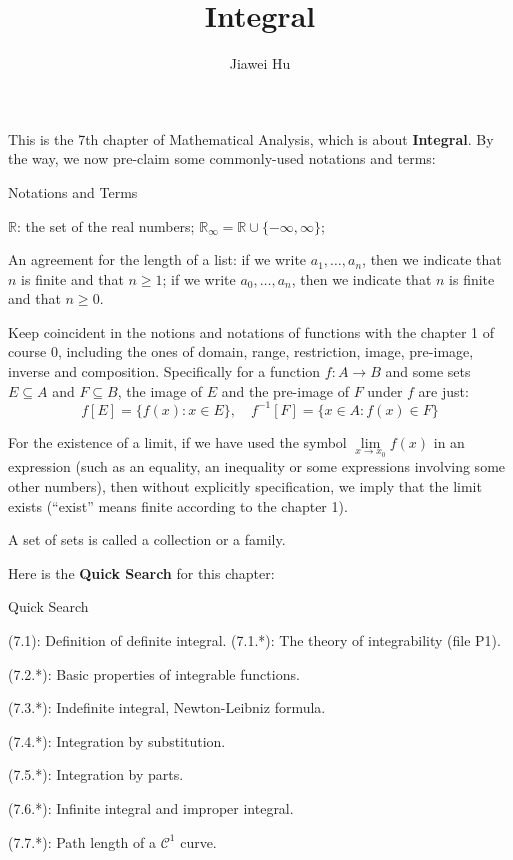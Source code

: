 \documentclass{article}
\title{\LARGE \textbf{Integral}}
\author{\large Jiawei Hu}
\begin{document}
\maketitle

This is the 7th chapter of Mathematical Analysis, which is about \textbf{Integral}. By the way, we now pre-claim some commonly-used notations and terms:
\begin{Df}{Notations and Terms}
    \begin{compactenum}
        \item $\mathbb{R}$: the set of the real numbers; $\mathbb{R}_\infty = \mathbb{R}\cup\{-\infty, \infty\}$;
        \item An agreement for the length of a list: if we write $a_1, \dots, a_n$, then we indicate that $n$ is finite and that $n\geq 1$; if we write $a_0, \dots, a_n$, then we indicate that $n$ is finite and that $n\geq 0$.
        \item Keep coincident in the notions and notations of functions with the chapter 1 of course 0, including the ones of domain, range, restriction, image, pre-image, inverse and composition. Specifically for a function $f: A\rightarrow B$ and some sets $E\subseteq A$ and $F\subseteq B$, the image of $E$ and the pre-image of $F$ under $f$ are just:
        $$f[E] = \{f(x): x\in E\},\quad f^{-1}[F] = \{x\in A: f(x)\in F\}$$
        \item For the existence of a limit, if we have used the symbol $\lim\limits_{x\to x_0} f(x)$ in an expression (such as an equality, an inequality or some expressions involving some other numbers), then without explicitly specification, we imply that the limit exists (``exist'' means finite according to the chapter 1).
        \item A set of sets is called a collection or a family.
    \end{compactenum}
\end{Df}

Here is the \textbf{Quick Search} for this chapter:
\begin{Th}{Quick Search}
    \begin{compactdesc}
        \item (7.1): Definition of definite integral.
            \subitem (7.1.*): The theory of integrability (file P1).
        \item (7.2.*): Basic properties of integrable functions.
        \item (7.3.*): Indefinite integral, Newton-Leibniz formula.
        \item (7.4.*): Integration by substitution.
        \item (7.5.*): Integration by parts.
        \item (7.6.*): Infinite integral and improper integral.
        \item (7.7.*): Path length of a $\mathcal{C}^1$ curve.
    \end{compactdesc}
\end{Th}
\end{document}
